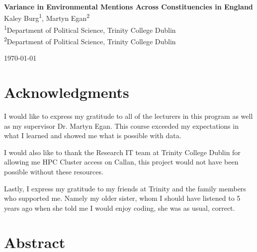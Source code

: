\documentclass[12pt,letterpaper]{article}
\begin{document}
	
	\begin{titlepage}
		\thispagestyle{titlepageheader} %
		
		\vspace*{5cm} %
		\begin{center}
			\Large{\textbf{Variance in Environmental Mentions Across Constituencies in England}} \\ %
			\vspace{1.5cm}
{\large Kaley Burg\textsuperscript{1}, Martyn Egan\textsuperscript{2}}\\[0.5cm]
{\small\textsuperscript{1}Department of Political Science, Trinity College Dublin\\
	\textsuperscript{2}Department of Political Science, Trinity College Dublin}

			\vspace{1.5cm}
			\large{\today} %
		\end{center}
	\end{titlepage}
			
			\tableofcontents
			

			
			\newpage
			
\section*{Acknowledgments}

\noindent			
I would like to express my gratitude to all of the lecturers in this program as well as my supervisor Dr. Martyn Egan. This course exceeded my expectations in what I learned and showed me what is possible with data.
			\vspace{0.5cm}

\noindent		
I would also like to thank the Research IT team at Trinity College Dublin for allowing me HPC Cluster access on Callan, this project would not have been possible without these resources.

			\vspace{0.5cm}
\noindent
Lastly, I express my gratitude to my friends at Trinity and the family members who supported me. Namely my older sister, whom I should have listened to 5 years ago when she told me I would enjoy coding, she was as usual, correct.
			
			\newpage
	
	\section{Abstract}
	
\end{document}
